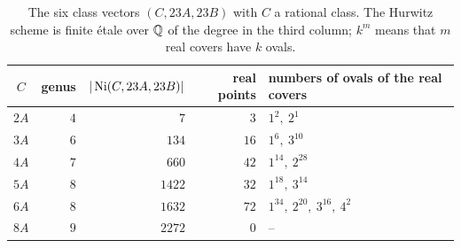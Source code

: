 \begin{table}[ht]
\centering\small
\begin{tabular}{@{}crrrl@{}}
\toprule
$C$ & genus & $|\operatorname{Ni}(C,23A,23B)|$ & real points & numbers of ovals of the real covers\\
\midrule
$2A$ & $4$ & $7$ & $3$ & $1^{2},\ 2^{1}$\\
$3A$ & $6$ & $134$ & $16$ & $1^{6},\ 3^{10}$\\
$4A$ & $7$ & $660$ & $42$ & $1^{14},\ 2^{28}$\\
$5A$ & $8$ & $1422$ & $32$ & $1^{18},\ 3^{14}$\\
$6A$ & $8$ & $1632$ & $72$ & $1^{34},\ 2^{20},\ 3^{16},\ 4^{2}$\\
$8A$ & $9$ & $2272$ & $0$ & $\text{--}$\\
\bottomrule
\end{tabular}
\caption{The six class vectors $(C,23A,23B)$ with $C$ a rational class. The Hurwitz scheme is finite \'etale over $\mathbb{Q}$ of the degree in the third column; $k^{m}$ means that $m$ real covers have $k$ ovals.}
\label{tab:passports}
\end{table}
